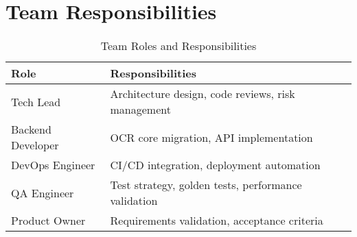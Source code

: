\documentclass[11pt,a4paper]{article}
\begin{document}
\section{Team Responsibilities}

\begin{table}[h!]
\centering
\begin{tabular}{|l|p{8cm}|}
\hline
\rowcolor{gray!30}
\textbf{Role} & \textbf{Responsibilities} \\
\hline
Tech Lead & Architecture design, code reviews, risk management \\
\hline
Backend Developer & OCR core migration, API implementation \\
\hline
DevOps Engineer & CI/CD integration, deployment automation \\
\hline
QA Engineer & Test strategy, golden tests, performance validation \\
\hline
Product Owner & Requirements validation, acceptance criteria \\
\hline
\end{tabular}
\caption{Team Roles and Responsibilities}
\end{table}
\end{document}
